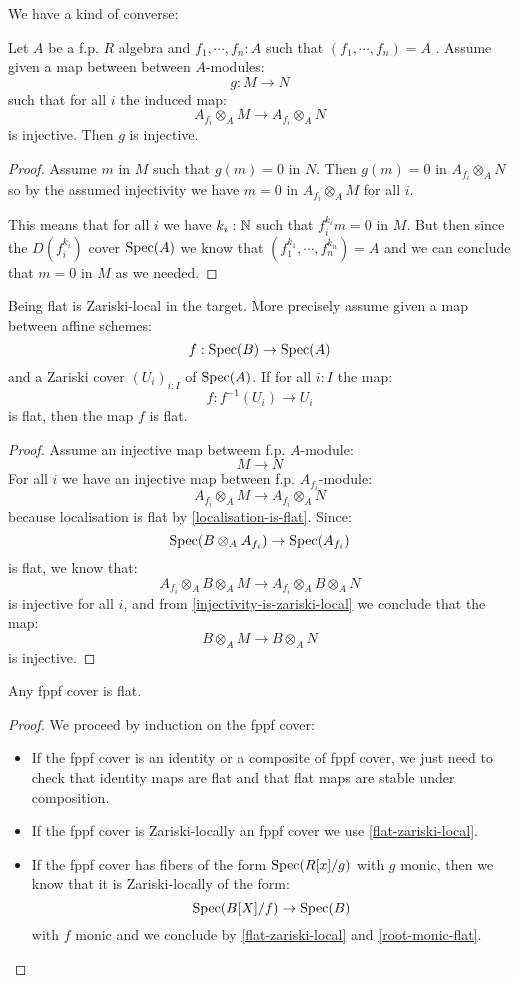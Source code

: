 We have a kind of converse:

\begin{lemma}\label{injectivity-is-zariski-local}
Let $A$ be a f.p. $R$ algebra and $f_1,\cdots,f_n:A$ such that $(f_1,\cdots,f_n) = A$ . Assume given a map between between $A$-modules:
\[g:M\to N\] 
such that for all $i$ the induced map:
\[A_{f_i}\otimes_AM \to A_{f_i}\otimes_AN\]
is injective. Then $g$ is injective.
\end{lemma}

\begin{proof}
Assume $m$ in $M$ such that $g(m)=0$ in $N$. Then $g(m) =0$ in $A_{f_i}\otimes_AN$ so by the assumed injectivity we have $m=0$ in $A_{f_i}\otimes_AM$ for all $i$.

This means that for all $i$ we have $k_i:\mathbb{N}$ such that $f_i^{k_i}m = 0$ in $M$. But then since the $D(f_i^{k_i})$ cover $\operatorname{Spec}(A)$ we know that $(f_1^{k_1},\cdots,f_n^{k_n}) = A$ and we can conclude that $m=0$ in $M$ as we needed.
\end{proof}

\begin{lemma}\label{flat-zariski-local}
Being flat is Zariski-local in the target. More precisely assume given a map between affine schemes:
\[f:\operatorname{Spec}(B)\to \operatorname{Spec}(A)\]
and a Zariski cover $(U_i)_{i:I}$ of $\operatorname{Spec}(A)$. If for all $i:I$ the map:
\[f : f^{-1}(U_i)\to U_i\]
is flat, then the map $f$ is flat.
\end{lemma}

\begin{proof}
Assume an injective map betweem f.p. $A$-module:
\[M\to N\]
For all $i$ we have an injective map between f.p. $A_{f_i}$-module:
\[A_{f_i}\otimes_AM\to A_{f_i}\otimes_AN\]
because localisation is flat by \cref{localisation-is-flat}. Since:
\[\operatorname{Spec}(B\otimes_AA_{f_i})\to \operatorname{Spec}(A_{f_i})\]
is flat, we know that:
\[A_{f_i}\otimes_AB\otimes_AM\to A_{f_i}\otimes_AB\otimes_AN\]
is injective for all $i$, and from \cref{injectivity-is-zariski-local} we conclude that the map:
\[B\otimes_AM\to B\otimes_AN\]
is injective.
\end{proof}

\begin{lemma}\label{cover-is-flat}
Any fppf cover is flat.
\end{lemma}

\begin{proof}
We proceed by induction on the fppf cover:
\begin{itemize}
\item If the fppf cover is an identity or a composite of fppf cover, we just need to check that identity maps are flat and that flat maps are stable under composition.
\item If the fppf cover is Zariski-locally an fppf cover we use \cref{flat-zariski-local}.
\item If the fppf cover has fibers of the form $\operatorname{Spec}(R[x]/g)$ with $g$ monic, then we know that it is Zariski-locally of the form:
\[\operatorname{Spec}(B[X]/f)\to \operatorname{Spec}(B)\]
with $f$ monic and we conclude by \cref{flat-zariski-local} and \cref{root-monic-flat}.
\end{itemize}
\end{proof}

